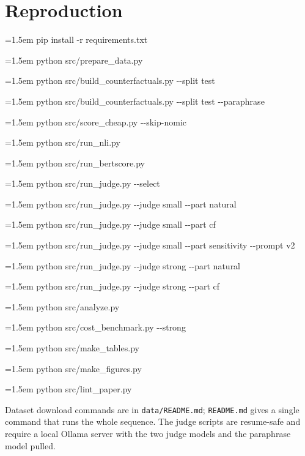 \section{Reproduction}
\label{app:repro}

{\footnotesize\ttfamily\raggedright\setlength{\parskip}{1pt}
\par\hangindent=1.5em pip install -r requirements.txt
\par\hangindent=1.5em python src/prepare\_data.py
\par\hangindent=1.5em python src/build\_counterfactuals.py -{}-split test
\par\hangindent=1.5em python src/build\_counterfactuals.py -{}-split test -{}-paraphrase
\par\hangindent=1.5em python src/score\_cheap.py -{}-skip-nomic
\par\hangindent=1.5em python src/run\_nli.py
\par\hangindent=1.5em python src/run\_bertscore.py
\par\hangindent=1.5em python src/run\_judge.py -{}-select
\par\hangindent=1.5em python src/run\_judge.py -{}-judge small -{}-part natural
\par\hangindent=1.5em python src/run\_judge.py -{}-judge small -{}-part cf
\par\hangindent=1.5em python src/run\_judge.py -{}-judge small -{}-part sensitivity -{}-prompt v2
\par\hangindent=1.5em python src/run\_judge.py -{}-judge strong -{}-part natural
\par\hangindent=1.5em python src/run\_judge.py -{}-judge strong -{}-part cf
\par\hangindent=1.5em python src/analyze.py
\par\hangindent=1.5em python src/cost\_benchmark.py -{}-strong
\par\hangindent=1.5em python src/make\_tables.py
\par\hangindent=1.5em python src/make\_figures.py
\par\hangindent=1.5em python src/lint\_paper.py\par}
\noindent Dataset download commands are in \texttt{data/README.md}; \texttt{README.md} gives a single command that runs the whole sequence. The judge scripts are resume-safe and require a local Ollama server with the two judge models and the paraphrase model pulled.

